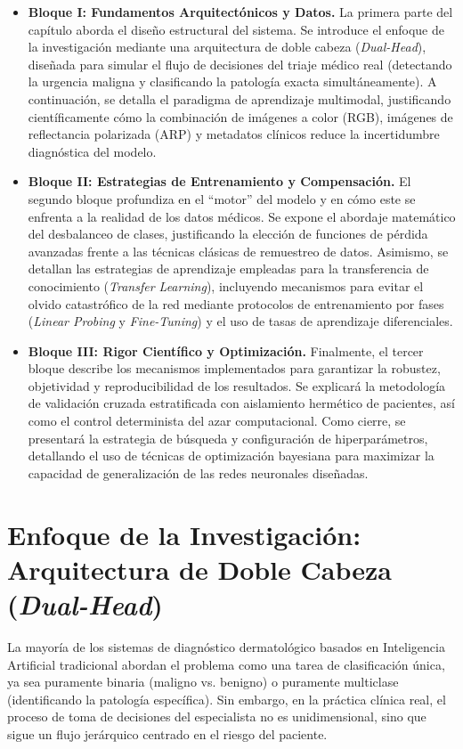 \begin{itemize}
	\item \textbf{Bloque I: Fundamentos Arquitectónicos y Datos.} La primera parte del capítulo aborda el diseño estructural del sistema. Se introduce el enfoque de la investigación mediante una arquitectura de doble cabeza (\textit{Dual-Head}), diseñada para simular el flujo de decisiones del triaje médico real (detectando la urgencia maligna y clasificando la patología exacta simultáneamente). A continuación, se detalla el paradigma de aprendizaje multimodal, justificando científicamente cómo la combinación de imágenes a color (RGB), imágenes de reflectancia polarizada (ARP) y metadatos clínicos reduce la incertidumbre diagnóstica del modelo.
	
	\item \textbf{Bloque II: Estrategias de Entrenamiento y Compensación.} El segundo bloque profundiza en el ``motor'' del modelo y en cómo este se enfrenta a la realidad de los datos médicos. Se expone el abordaje matemático del desbalanceo de clases, justificando la elección de funciones de pérdida avanzadas frente a las técnicas clásicas de remuestreo de datos. Asimismo, se detallan las estrategias de aprendizaje empleadas para la transferencia de conocimiento (\textit{Transfer Learning}), incluyendo mecanismos para evitar el olvido catastrófico de la red mediante protocolos de entrenamiento por fases (\textit{Linear Probing} y \textit{Fine-Tuning}) y el uso de tasas de aprendizaje diferenciales.
	
	\item \textbf{Bloque III: Rigor Científico y Optimización.} Finalmente, el tercer bloque describe los mecanismos implementados para garantizar la robustez, objetividad y reproducibilidad de los resultados. Se explicará la metodología de validación cruzada estratificada con aislamiento hermético de pacientes, así como el control determinista del azar computacional. Como cierre, se presentará la estrategia de búsqueda y configuración de hiperparámetros, detallando el uso de técnicas de optimización bayesiana para maximizar la capacidad de generalización de las redes neuronales diseñadas.
\end{itemize}

\section{Enfoque de la Investigación: Arquitectura de Doble Cabeza (\textit{Dual-Head})}

La mayoría de los sistemas de diagnóstico dermatológico basados en Inteligencia Artificial tradicional abordan el problema como una tarea de clasificación única, ya sea puramente binaria (maligno vs. benigno) o puramente multiclase (identificando la patología específica). Sin embargo, en la práctica clínica real, el proceso de toma de decisiones del especialista no es unidimensional, sino que sigue un flujo jerárquico centrado en el riesgo del paciente.

